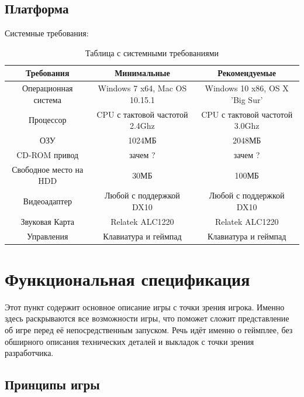 \documentclass{article}
\begin{document}
\subsection{Платформа}
    \item Системные требования:
    	\begin{table}[h]
        \centering
        \begin{tabular}{|c|c|c|}
            \hline
            Требования & Минимальные & Рекомендуемые \\
            \hline
            Операционная система & Windows 7 x64, Mac OS 10.15.1 & Windows 10 x86, OS X 'Big Sur'\\
            \hline
            Процессор & CPU с тактовой частотой 2.4Ghz& CPU с тактовой частотой 3.0Ghz \\
            \hline
            ОЗУ & 1024МБ & 2048МБ \\
            \hline
            CD-ROM привод & зачем ? & зачем ? \\
            \hline
            Свободное место на HDD & 30МБ & 100МБ \\
            \hline
            Видеоадаптер & Любой с поддержкой DX10 & Любой с поддержкой DX10 \\
            \hline
            Звуковая Карта & Relatek ALC1220 & Relatek ALC1220 \\
            \hline
            Управления & Клавиатура и геймпад & Клавиатура и геймпад \\
            \hline
        \end{tabular}
        \caption{Таблица с системными требованиями}
        \label{tab:systemrequirements}
\end{table}


\section{Функциональная спецификация}

Этот пункт содержит основное описание игры с точки зрения игрока. Именно здесь раскрываются все возможности игры, что поможет сложит представление об игре перед её непосредственным запуском. Речь идёт именно о геймплее, без обширного описания технических деталей и выкладок с точки зрения разработчика. 


\subsection{Принципы игры}
\end{document}
